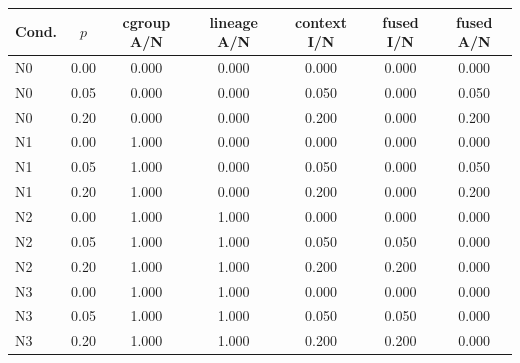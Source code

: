 \begin{tabular*}{\columnwidth}{@{\extracolsep{\fill}}lcccccc@{}}
\toprule
Cond. & $p$ & cgroup A/N & lineage A/N & context I/N & fused I/N & fused A/N \\
\midrule
N0 & 0.00 & 0.000 & 0.000 & 0.000 & 0.000 & 0.000 \\
N0 & 0.05 & 0.000 & 0.000 & 0.050 & 0.000 & 0.050 \\
N0 & 0.20 & 0.000 & 0.000 & 0.200 & 0.000 & 0.200 \\
N1 & 0.00 & 1.000 & 0.000 & 0.000 & 0.000 & 0.000 \\
N1 & 0.05 & 1.000 & 0.000 & 0.050 & 0.000 & 0.050 \\
N1 & 0.20 & 1.000 & 0.000 & 0.200 & 0.000 & 0.200 \\
N2 & 0.00 & 1.000 & 1.000 & 0.000 & 0.000 & 0.000 \\
N2 & 0.05 & 1.000 & 1.000 & 0.050 & 0.050 & 0.000 \\
N2 & 0.20 & 1.000 & 1.000 & 0.200 & 0.200 & 0.000 \\
N3 & 0.00 & 1.000 & 1.000 & 0.000 & 0.000 & 0.000 \\
N3 & 0.05 & 1.000 & 1.000 & 0.050 & 0.050 & 0.000 \\
N3 & 0.20 & 1.000 & 1.000 & 0.200 & 0.200 & 0.000 \\
\bottomrule
\end{tabular*}
